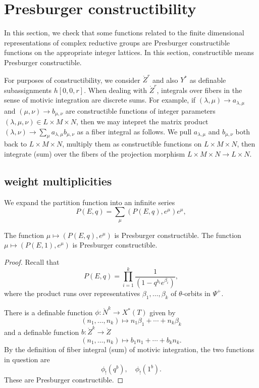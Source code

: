 \section{Presburger constructibility}

In this section,
we check that some functions related to the finite dimensional representations of complex reductive groups
are Presburger constructible functions on the appropriate integer lattices.  In this section, constructible means Presburger
constructible.

\begin{remark}\label{rem:matrix}
For purposes of constructibility, we consider $\ring{Z}^r$ and also $Y^*$ as 
definable subassignments $h[0,0,r]$. When dealing with $\ring{Z}^r$, integrals over fibers
in the sense of motivic integration are discrete sums.  For example, if $(\lambda,\mu)\to a_{\lambda,\mu}$
and $(\mu,\nu)\to b_{\mu,\nu}$ are constructible functions of integer parameters $(\lambda,\mu,\nu)\in L\times M\times N$,
then we may intepret the matrix product $(\lambda,\nu)\to \sum_{\mu} a_{\lambda,\mu} b_{\mu,\nu}$ as a
fiber integral as follows.  We pull $a_{\lambda,\mu}$ and $b_{\mu,\nu}$ both back to $L\times M\times N$, multiply
them as constructible functions on $L\times M\times N$, then integrate (sum) over the fibers of the projection morphism
$L\times M\times N\to L\times N$.
\end{remark}




\subsection{weight multiplicities}

We expand the partition function into an infinite series
\[
P(E,q) = \sum_\mu (P(E,q),e^\mu) e^{\mu},
\]

\begin{lemma}\label{lemma:partition}
The function $\mu\mapsto (P(E,q),e^\mu)$ is Presburger constructible.
The function $\mu\mapsto (P(E,1),e^\mu)$ is Presburger constructible.
\end{lemma}

\begin{proof} 
Recall that
\[
P(E,q) = \prod_{i=1}^k \frac{1}{ (1-q^{b_i} e^{\beta_i})},
\]
where the product runs over representatives $\beta_1,\ldots,\beta_k$ of $\theta$-orbits in $\Psi^+$.

There is a definable function $\phi:\ring{N}^k\to X^*(T)$ given by
\[
(n_1,\ldots,n_k)\mapsto n_1 \beta_1+\cdots + n_k \beta_k
\]
and a definable function $b:\ring{Z}^k\to \ring{Z}$ 
\[
(n_1,\ldots,n_k)\mapsto b_1 n_1+\cdots + b_k n_k.
\]
By the definition of fiber integral (sum) of motivic integration,  the two  functions in question are
\[
\phi_! (q^b),\quad \phi_!(1^b).
\]
These are Presburger constructible.
\end{proof}


